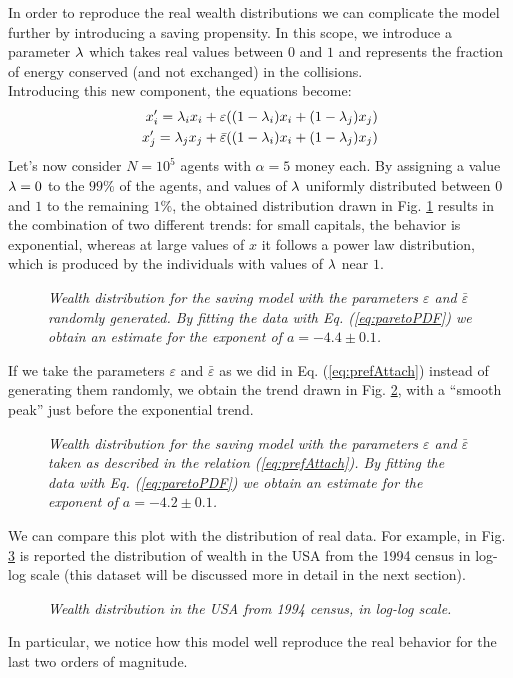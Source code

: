 In order to reproduce the real wealth distributions we can complicate the model further by introducing a saving propensity.
In this scope, we introduce a parameter $\lambda$ which takes real values between $0$ and $1$ and represents the fraction of energy conserved (and not exchanged) in the collisions. \\
Introducing this new component, the equations become:
\begin{equation}
	\begin{split}
		x'_i = \lambda_ix_i + \varepsilon((1-\lambda_i)x_i + (1-\lambda_j)x_j) 	\\
		x'_j = \lambda_jx_j + \bar{\varepsilon}((1-\lambda_i)x_i + (1-\lambda_j)x_j) 	\\
	\end{split}
\end{equation}
Let's now consider $N = 10^5$ agents with $\alpha = 5$ money each.
By assigning a value $\lambda = 0$ to the $99 \%$ of the agents, and values of $\lambda$ uniformly distributed between $0$ and $1$ to the remaining $1\%$, the obtained distribution drawn in Fig. \ref{fig:savings} results in the combination of two different trends: for small capitals, the behavior is exponential, whereas at large values of $x$ it follows a power law distribution, which is produced by the individuals with values of $\lambda$ near $1$.
\begin{figure}[H]
    \centering
    \scalebox{.7}{}
    \caption{\emph{Wealth distribution for the saving model with the parameters $\varepsilon$ and $\bar{\varepsilon}$ randomly generated. By fitting the data with Eq. (\ref{eq:paretoPDF}) we obtain an estimate for the exponent of $a = -4.4 \pm 0.1$.}}
    \label{fig:savings}
\end{figure}
If we take the parameters $\varepsilon$ and $\bar{\varepsilon}$ as we did in Eq. (\ref{eq:prefAttach}) instead of generating them randomly, we obtain the trend drawn in Fig. \ref{fig:savingsPref}, with a ``smooth peak'' just before the exponential trend.
\begin{figure}[H]
    \centering
    \scalebox{.7}{}
    \caption{\emph{Wealth distribution for the saving model with the parameters $\varepsilon$ and $\bar{\varepsilon}$ taken as described in the relation (\ref{eq:prefAttach}). By fitting the data with Eq. (\ref{eq:paretoPDF}) we obtain an estimate for the exponent of $a = -4.2 \pm 0.1$.}}
    \label{fig:savingsPref}
\end{figure}
We can compare this plot with the distribution of real data.
For example, in Fig. \ref{fig:savingsLog} is reported the distribution of wealth in the USA from the 1994 census in log-log scale (this dataset will be discussed more in detail in the next section).
\begin{figure}[H]
    \centering
    \scalebox{.7}{}
    \caption{\emph{Wealth distribution in the USA from 1994 census, in log-log scale.}}
    \label{fig:savingsLog}
\end{figure}
In particular, we notice how this model well reproduce the real behavior for the last two orders of magnitude.
